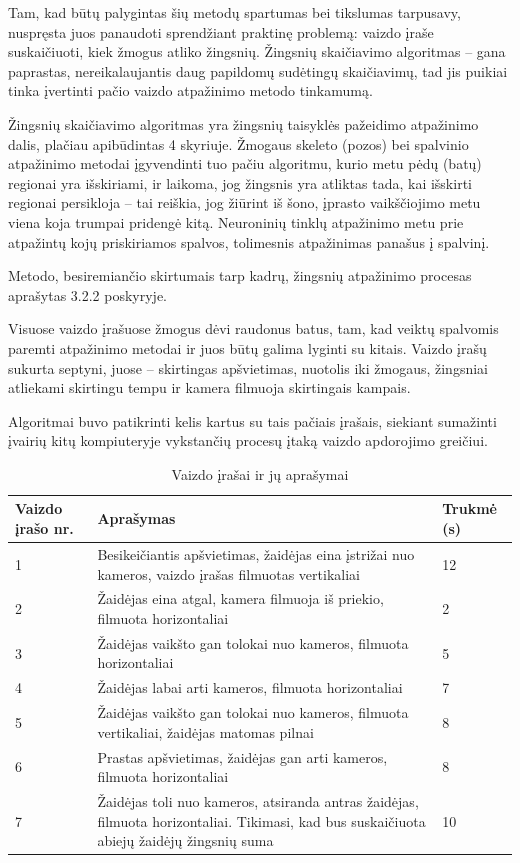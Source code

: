 \documentclass{VUMIFPSbakalaurinis}
\begin{document}
Tam, kad būtų palygintas šių metodų spartumas bei tikslumas tarpusavy, nuspręsta juos panaudoti sprendžiant praktinę problemą: vaizdo įraše suskaičiuoti, kiek žmogus atliko žingsnių. Žingsnių skaičiavimo algoritmas – gana paprastas, nereikalaujantis daug papildomų sudėtingų skaičiavimų, tad jis puikiai tinka įvertinti pačio vaizdo atpažinimo metodo tinkamumą.  

Žingsnių skaičiavimo algoritmas yra žingsnių taisyklės pažeidimo atpažinimo dalis, plačiau apibūdintas 4 skyriuje. Žmogaus skeleto (pozos) bei spalvinio atpažinimo metodai įgyvendinti tuo pačiu algoritmu, kurio metu pėdų (batų) regionai yra išskiriami, ir laikoma, jog žingsnis yra atliktas tada, kai išskirti regionai persikloja – tai reiškia, jog žiūrint iš šono, įprasto vaikščiojimo metu viena koja trumpai pridengė kitą. Neuroninių tinklų atpažinimo metu prie atpažintų kojų priskiriamos spalvos, tolimesnis atpažinimas panašus į spalvinį.

Metodo, besiremiančio skirtumais tarp kadrų, žingsnių atpažinimo procesas aprašytas 3.2.2 poskyryje.

Visuose vaizdo įrašuose žmogus dėvi raudonus batus, tam, kad veiktų spalvomis paremti atpažinimo metodai ir juos būtų galima lyginti su kitais. Vaizdo įrašų sukurta septyni, juose – skirtingas apšvietimas, nuotolis iki žmogaus, žingsniai atliekami skirtingu tempu ir kamera filmuoja skirtingais kampais. 

Algoritmai buvo patikrinti kelis kartus su tais pačiais įrašais, siekiant sumažinti įvairių kitų kompiuteryje vykstančių procesų įtaką vaizdo apdorojimo greičiui. 

\begin{table}[H]\footnotesize
	\centering
	\caption{Vaizdo įrašai ir jų aprašymai}
	{\begin{tabular}{|p{2cm}|p{8cm}|p{2cm}|} \hline
			\textbf{Vaizdo įrašo nr.} & \textbf{Aprašymas}  & \textbf{Trukmė (s)} \\
			\hline
			1  & Besikeičiantis apšvietimas, žaidėjas eina įstrižai nuo kameros, vaizdo įrašas filmuotas vertikaliai & 12      \\
			\hline
			2  & Žaidėjas eina atgal, kamera filmuoja iš priekio, filmuota horizontaliai          & 2 \\
			\hline
			3  & Žaidėjas vaikšto gan tolokai nuo kameros, filmuota horizontaliai       	 & 5 \\ 
			\hline
			4  & Žaidėjas labai arti kameros, filmuota horizontaliai       
		 	& 7  \\ \hline
			5  & Žaidėjas vaikšto gan tolokai nuo kameros, filmuota vertikaliai, žaidėjas matomas pilnai    & 8    \\
			\hline
			6  & Prastas apšvietimas, žaidėjas gan arti kameros, filmuota horizontaliai       
			& 8 \\
			\hline
			7  & Žaidėjas toli nuo kameros, atsiranda antras žaidėjas, filmuota horizontaliai. Tikimasi, kad bus suskaičiuota abiejų žaidėjų žingsnių suma   & 10     \\
			\hline
	\end{tabular}}
	\label{tab:openposevslightweight}
\end{table}
\end{document}
